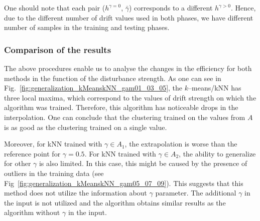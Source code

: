 \documentclass[aps,pra,showkeys,showpacs,notitlepage,superscriptaddress]{revtex4-1}
\newcommand{\1}{{\rm 1\hspace{-0.9mm}l}}
\newcommand{\NCP}{\ensuremath{h^{\gamma=0}}\xspace}
\newcommand{\DCP}{\ensuremath{h^{\gamma >0}}\xspace}
\begin{document}

One should note that each pair (\NCP, $\bar{\gamma}$) corresponds to a different \DCP. Hence, due to the different number of drift values used in both phases, we have different number of samples in the training and testing phases.

\subsubsection{Comparison of the results}

The above procedures enable us to analyse the changes in the efficiency for both methods in the function of the disturbance strength. As one can see in Fig.~\ref{fig:generalization_kMeanskNN_gam01_03_05}, the $k$--means/kNN has three local maxima, which correspond to the values of drift strength on which the algorithm was trained. Therefore, this algorithm has noticeable drops in the interpolation. One can conclude that the clustering trained on the values from $A$ is as good as the clustering trained on a single value.



Moreover, for kNN trained with $\gamma \in A_1$, the extrapolation is worse than the reference point for $\gamma=0.5$. For kNN trained with $\gamma \in A_2$,
the ability to generalize for other $\gamma$ is also limited. In this case, this might be caused by the presence of outliers in the training data (see Fig~\ref{fig:generalization_kMeanskNN_gam05_07_09}).
This suggests that this method does not utilize the information about 
$\gamma$ parameter. The additional $\gamma$ in the input is not utilized and 
the algorithm obtains similar results as the algorithm without $\gamma$ in the 
input. 
\end{document}
